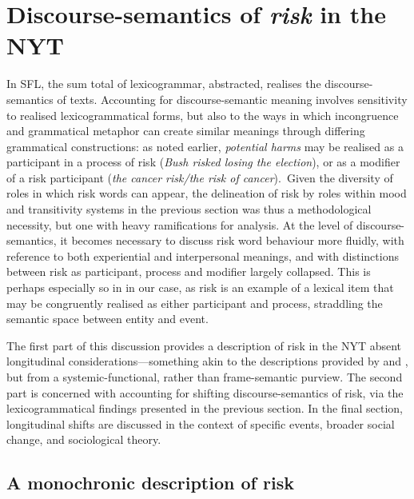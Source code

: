 
\chapter{Discourse-semantics of \emph{risk} in the NYT} \label{chap:discussion}

In SFL, the sum total of lexicogrammar, abstracted, realises the discourse-semantics of texts. Accounting for discourse-semantic meaning involves sensitivity to realised lexicogrammatical forms, but also to the ways in which incongruence and grammatical metaphor can create similar meanings through differing grammatical constructions: as noted earlier, \emph{potential harms} may be realised as a participant in a process of risk (\emph{Bush risked losing the election}), or as a modifier of a risk participant (\emph{the cancer risk\slash the risk of cancer}).~Given the diversity of roles in which risk words can appear, the delineation of risk by roles within mood and transitivity systems in the previous section was thus a methodological necessity, but one with heavy ramifications for analysis. At the level of discourse-semantics, it becomes necessary to discuss risk word behaviour more fluidly, with reference to both experiential and interpersonal meanings, and with distinctions between risk as participant, process and modifier largely collapsed. This is perhaps especially so in in our case, as risk is an example of a lexical item that may be congruently realised as either participant and process, straddling the semantic space between entity and event.

The first part of this discussion provides a description of risk in the NYT absent longitudinal considerations---something akin to the descriptions provided by  and , but from a systemic-functional, rather than frame-semantic purview. The second part is concerned with accounting for shifting discourse-semantics of risk, via the lexicogrammatical findings presented in the previous section. In the final section, longitudinal shifts are discussed in the context of specific events, broader social change, and sociological theory.

\section{A monochronic description of risk}

